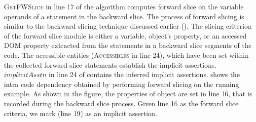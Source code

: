 \textsc{GetFWSlice} in line 17 of the algorithm computes forward slice on the variable operands of a statement in the backward slice.
The process of forward slicing is similar to the backward slicing technique discussed earlier (). The slicing criterion of the forward slice module is either a variable, object's property, or an accessed DOM property extracted from the statements in a backward slice segments of the code. The accessible entities (\textsc{Accessibles} in line 24), which have been set within the collected forward slice statements establish the implicit assertions.
$implicitAsstn$ in line 24 of  contains the inferred implicit assertions.
 shows the intra code dependency obtained by performing forward slicing on the running example. 
As shown in the figure, the properties of object  are set in line 16, that is recorded during the backward slice process. Given line 16 as the forward slice criteria, we mark  (line 19) as an implicit assertion.        